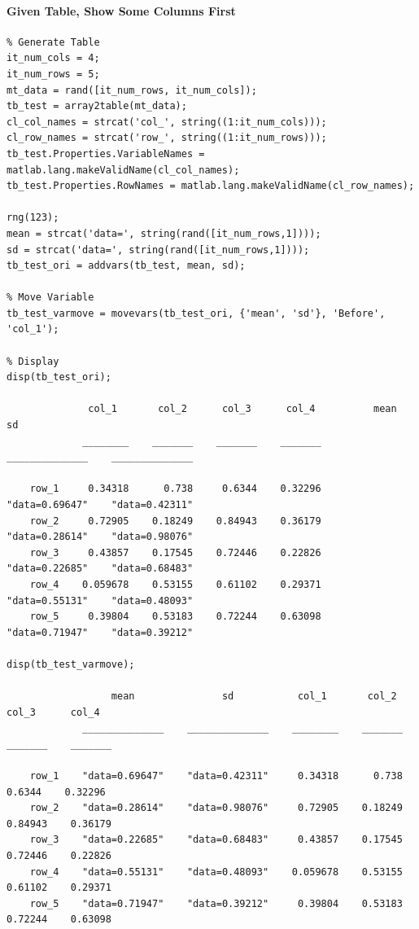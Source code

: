 \documentclass[
]{book}
\begin{document}
\hypertarget{given-table-show-some-columns-first}{%
\paragraph{Given Table, Show Some Columns First}\label{given-table-show-some-columns-first}}

\begin{verbatim}
% Generate Table
it_num_cols = 4;
it_num_rows = 5;
mt_data = rand([it_num_rows, it_num_cols]);
tb_test = array2table(mt_data);
cl_col_names = strcat('col_', string((1:it_num_cols)));
cl_row_names = strcat('row_', string((1:it_num_rows)));
tb_test.Properties.VariableNames = matlab.lang.makeValidName(cl_col_names);
tb_test.Properties.RowNames = matlab.lang.makeValidName(cl_row_names);

rng(123);
mean = strcat('data=', string(rand([it_num_rows,1])));
sd = strcat('data=', string(rand([it_num_rows,1])));
tb_test_ori = addvars(tb_test, mean, sd);

% Move Variable
tb_test_varmove = movevars(tb_test_ori, {'mean', 'sd'}, 'Before', 'col_1');

% Display
disp(tb_test_ori);

              col_1       col_2      col_3      col_4          mean               sd      
             ________    _______    _______    _______    ______________    ______________

    row_1     0.34318      0.738     0.6344    0.32296    "data=0.69647"    "data=0.42311"
    row_2     0.72905    0.18249    0.84943    0.36179    "data=0.28614"    "data=0.98076"
    row_3     0.43857    0.17545    0.72446    0.22826    "data=0.22685"    "data=0.68483"
    row_4    0.059678    0.53155    0.61102    0.29371    "data=0.55131"    "data=0.48093"
    row_5     0.39804    0.53183    0.72244    0.63098    "data=0.71947"    "data=0.39212"

disp(tb_test_varmove);

                  mean               sd           col_1       col_2      col_3      col_4 
             ______________    ______________    ________    _______    _______    _______

    row_1    "data=0.69647"    "data=0.42311"     0.34318      0.738     0.6344    0.32296
    row_2    "data=0.28614"    "data=0.98076"     0.72905    0.18249    0.84943    0.36179
    row_3    "data=0.22685"    "data=0.68483"     0.43857    0.17545    0.72446    0.22826
    row_4    "data=0.55131"    "data=0.48093"    0.059678    0.53155    0.61102    0.29371
    row_5    "data=0.71947"    "data=0.39212"     0.39804    0.53183    0.72244    0.63098
\end{verbatim}
\end{document}
